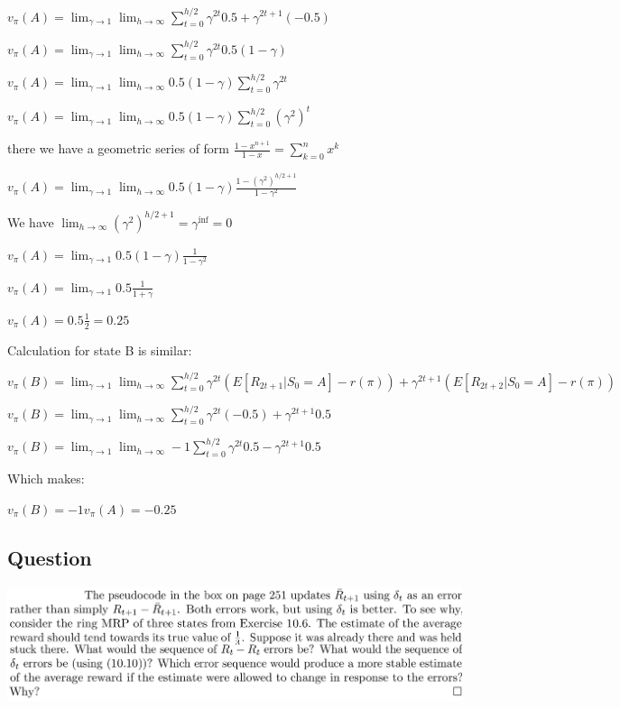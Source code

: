 \documentclass[11pt]{article}
\begin{document}
    \noindent $ v_\pi(A) = \lim_{\gamma \to 1} \lim_{h \to \infty} \sum_{t=0}^{h/2} \gamma^{2t} 0.5 + \gamma^{2t+1} (-0.5) $

    \noindent $ v_\pi(A) = \lim_{\gamma \to 1} \lim_{h \to \infty} \sum_{t=0}^{h/2} \gamma^{2t} 0.5  (1-\gamma) $

    \noindent $ v_\pi(A) = \lim_{\gamma \to 1} \lim_{h \to \infty} 0.5  (1-\gamma) \sum_{t=0}^{h/2} \gamma^{2t}  $

     \noindent $ v_\pi(A) = \lim_{\gamma \to 1} \lim_{h \to \infty} 0.5  (1-\gamma) \sum_{t=0}^{h/2} (\gamma^{2})^t  $

    \noindent there we have a geometric series of form $ \frac{1-x^{n+1}}{1-x} = \sum_{k=0}^{n} x^k $

    \noindent $ v_\pi(A) = \lim_{\gamma \to 1} \lim_{h \to \infty} 0.5  (1-\gamma) \frac{1-(\gamma^2)^{h/2+1}}{1-\gamma^2}  $

    \noindent We have $ \lim_{h \to \infty} (\gamma^2)^{h/2+1} = \gamma^{\inf} = 0 $

    \noindent $ v_\pi(A) = \lim_{\gamma \to 1} 0.5  (1-\gamma) \frac{1}{1-\gamma^2}  $

    \noindent $ v_\pi(A) = \lim_{\gamma \to 1} 0.5 \frac{1}{1+\gamma}  $

    \noindent $ v_\pi(A) = 0.5 \frac{1}{2} = 0.25  $

    Calculation for state B is similar:

    \noindent $ v_\pi(B) = \lim_{\gamma \to 1} \lim_{h \to \infty} \sum_{t=0}^{h/2} \gamma^{2t} (E[R_{2t+1} |S_0=A] - r(\pi)) + \gamma^{2t+1} (E[R_{2t+2} |S_0=A] - r(\pi)) $

    \noindent $ v_\pi(B) = \lim_{\gamma \to 1} \lim_{h \to \infty} \sum_{t=0}^{h/2} \gamma^{2t} (-0.5) + \gamma^{2t+1} 0.5 $

    \noindent $ v_\pi(B) = \lim_{\gamma \to 1} \lim_{h \to \infty} -1 \sum_{t=0}^{h/2} \gamma^{2t} 0.5 - \gamma^{2t+1} 0.5 $

    \noindent Which makes:

    \noindent $ v_\pi(B) = -1 v_\pi(A)  = -0.25 $


    \subsection{Question}

    \includegraphics[scale=0.9]{exercise_10_8q}
\end{document}
